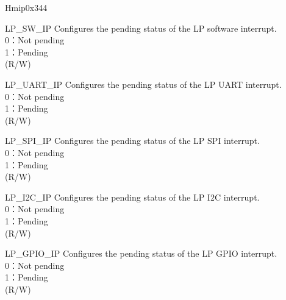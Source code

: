 \begin{register}{H}{mip}{0x344}\label{regdesc:LPMIP}
%
%
%
%
%
%
%
%
%
%
%
%
%
%
%
%
%
%
%
%
%
%
%
\regnewline%
\begin{regdesc}\begin{reglist}
\label{fielddesc:LPMIPLPSWIP}\item [LP\_SW\_IP] Configures the pending status of the LP software interrupt.\\
0：Not pending\\
1：Pending\\
(R/W)
\label{fielddesc:LPMIPLPUARTIP}\item [LP\_UART\_IP] Configures the pending status of the LP UART interrupt. \\
0：Not pending\\
1：Pending \\(R/W)
\label{fielddesc:LPMIPLPSPIIP}\item [LP\_SPI\_IP] Configures the pending status of the LP SPI interrupt.\\
0：Not pending\\
1：Pending \\(R/W)
\label{fielddesc:LPMIPI2CIP}\item [LP\_I2C\_IP] Configures the pending status of the LP I2C interrupt.\\
0：Not pending\\
1：Pending \\(R/W)
\label{fielddesc:LPMIPGPIOIP}\item [LP\_GPIO\_IP] Configures the pending status of the LP GPIO interrupt.\\
0：Not pending\\
1：Pending \\(R/W)

\end{reglist}
\end{regdesc}
\end{register}
